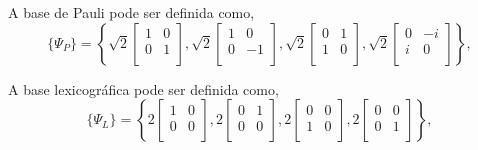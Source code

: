 A base de Pauli pode ser definida como,
\begin{equation}\label{base_de_pauli}
\{\Psi_P\} = \left\{
\sqrt{2}\left[\begin{array}{cc}
	1  & 0  \\
	0  & 1 \\
\end{array}\right],
\sqrt{2}\left[\begin{array}{cc}
	1  & 0  \\
	0  & -1  \\
\end{array}\right],
\sqrt{2}\left[\begin{array}{cc}
	0  & 1  \\
	1  & 0  \\
\end{array}\right],
\sqrt{2}\left[\begin{array}{cc}
	0       & -i  \\
	i  & 0  \\
\end{array}\right]
\right\},
\end{equation}

A base lexicográfica pode ser definida como,
\begin{equation}\label{base_de_lexicografica}
\{\Psi_L\} = \left\{
2\left[\begin{array}{cc}
	1  & 0  \\
	0  & 0 \\
\end{array}\right],
2\left[\begin{array}{cc}
	0  & 1  \\
	0  & 0  \\
\end{array}\right],
2\left[\begin{array}{cc}
	0  & 0  \\
	1  & 0 \\
\end{array}\right],
2\left[\begin{array}{cc}
	0  & 0  \\
	0  & 1  \\
\end{array}\right]
\right\},
\end{equation}

